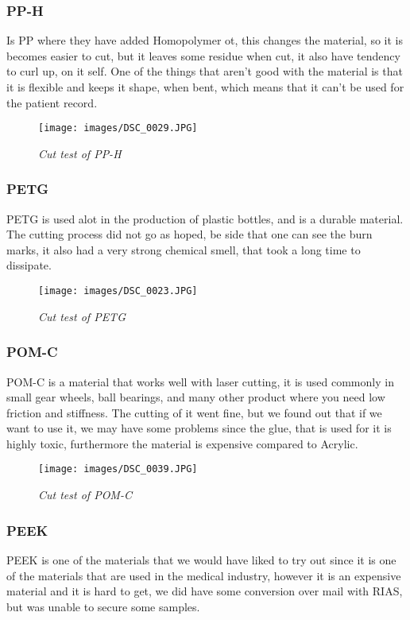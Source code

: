 \subsubsection{PP-H}
Is PP where they have added Homopolymer ot, this changes the material, so it is becomes easier to cut, but it leaves some residue when cut, it also have tendency to curl up, on it self.
One of the things that aren't good with the material is that it is flexible and keeps it shape, when bent, which means that it can't be used for the patient record.
\begin{figure}[h]
	\begin{center}
		\texttt{[image: images/DSC\_0029.JPG]}
		\caption{\small {\it {Cut test of PP-H}}} \label{fig:explode}
	\end{center}
\end{figure}
\subsubsection{PETG}
PETG is used alot in the production of plastic bottles, and is a durable material.
The cutting process did not go as hoped, be side that one can see the burn marks, it also had a very strong chemical smell, that took a long time to dissipate.
\begin{figure}[h]
	\begin{center}
		\texttt{[image: images/DSC\_0023.JPG]}
		\caption{\small {\it {Cut test of PETG}}} \label{fig:explode}
	\end{center}
\end{figure}
\subsubsection{POM-C}
POM-C is a material that works well with laser cutting, it is used commonly in small gear wheels, ball bearings, and many other product where you need low friction and stiffness.
The cutting of it went fine, but we found out that if we want to use it, we may have some problems since the glue, that is used for it is highly toxic, furthermore the material is expensive compared to Acrylic.
\begin{figure}[h]
	\begin{center}
		\texttt{[image: images/DSC\_0039.JPG]}
		\caption{\small {\it {Cut test of POM-C}}} \label{fig:explode}
	\end{center}
\end{figure}

\subsubsection{PEEK}
PEEK is one of the materials that we would have liked to try out since it is one of the materials that are used in the medical industry, however it is an expensive material and it is hard to get, we did have some conversion over mail with RIAS, but was unable to secure some samples.

